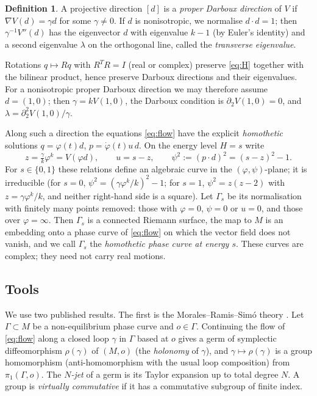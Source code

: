 \documentclass[11pt]{article}
\numberwithin{equation}{section}
\theoremstyle{definition}
\newtheorem{definition}[theorem]{Definition}
\theoremstyle{remark}
\begin{document}
\begin{definition}\label{def:darboux}
A projective direction $[d]$ is a \emph{proper Darboux direction} of $V$ if $\nabla V(d)=\gamma d$ for some
$\gamma\ne0$. If $d$ is nonisotropic, we normalise $d\cdot d=1$; then $\gamma^{-1}V''(d)$ has the eigenvector $d$
with eigenvalue $k-1$ (by Euler's identity) and a second eigenvalue $\lambda$ on the orthogonal line, called the
\emph{transverse eigenvalue}.
\end{definition}

Rotations $q\mapsto Rq$ with $R^{T}R=I$ (real or complex) preserve \eqref{eq:H} together with the bilinear product,
hence preserve Darboux directions and their eigenvalues. For a nonisotropic proper Darboux direction we may therefore
assume $d=(1,0)$; then $\gamma=kV(1,0)$, the Darboux condition is $\partial_2V(1,0)=0$, and
$\lambda=\partial_2^2V(1,0)/\gamma$.

Along such a direction the equations \eqref{eq:flow} have the explicit \emph{homothetic} solutions $q=\varphi(t)d$,
$p=\dot\varphi(t)u\,d$. On the energy level $H=s$ write
\begin{equation}\label{eq:homothetic}
z=\tfrac{\gamma}{k}\varphi^k=V(\varphi d),\qquad u=s-z,\qquad \psi^2:=(p\cdot d)^2=(s-z)^2-1 .
\end{equation}
For $s\in\{0,1\}$ these relations define an algebraic curve in the $(\varphi,\psi)$-plane; it is irreducible (for
$s=0$, $\psi^2=(\gamma\varphi^k/k)^2-1$; for $s=1$, $\psi^2=z(z-2)$ with $z=\gamma\varphi^k/k$, and neither right-hand
side is a square). Let $\Gamma_s$ be its normalisation with finitely many points removed: those with $\varphi=0$,
$\psi=0$ or $u=0$, and those over $\varphi=\infty$. Then $\Gamma_s$ is a connected Riemann surface, the map to $M$ is
an embedding onto a phase curve of \eqref{eq:flow} on which the vector field does not vanish, and we call $\Gamma_s$ the
\emph{homothetic phase curve at energy $s$}. These curves are complex; they need not carry real motions.

\subsection{Tools}
We use two published results. The first is the Morales--Ramis--Sim\'o theory \cite{MRS07}. Let $\Gamma\subset M$ be a
non-equilibrium phase curve and $o\in\Gamma$. Continuing the flow of \eqref{eq:flow} along a closed loop $\gamma$ in
$\Gamma$ based at $o$ gives a germ of symplectic diffeomorphism $\rho(\gamma)$ of $(M,o)$ (the \emph{holonomy} of
$\gamma$), and $\gamma\mapsto\rho(\gamma)$ is a group homomorphism (anti-homomorphism with the usual loop
composition) from $\pi_1(\Gamma,o)$. The \emph{$N$-jet} of a germ is its Taylor expansion up to total degree $N$.
A group is \emph{virtually commutative} if it has a commutative subgroup of finite index.
\end{document}
